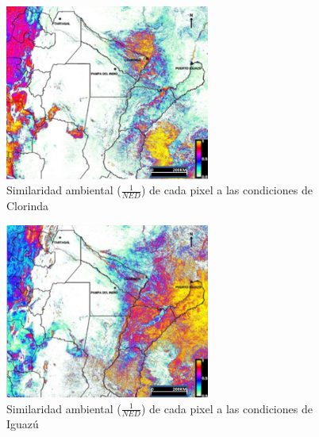   \begin{figure}[hbt]

    \centering%
    \includegraphics[width=0.6\textwidth]{images/ned_clorinda}%
    \caption{Similaridad ambiental ($\frac{1}{NED}$)
            de cada pixel a las condiciones de Clorinda}\label{fig:ned_clorinda}
  \end{figure}

  \begin{figure}[hbt]
    \centering%
    \includegraphics[width=0.6\textwidth]{images/ned_iguazu}%
    \caption{Similaridad ambiental ($\frac{1}{NED}$)
            de cada pixel a las condiciones de Iguazú}\label{fig:ned_iguazu}
  \end{figure}



